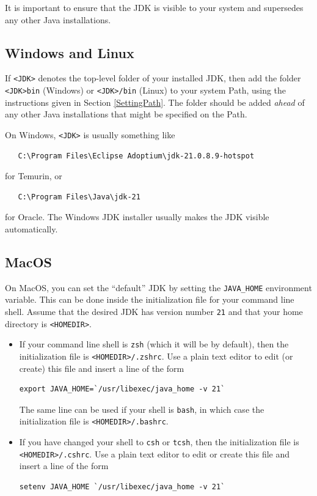 \documentclass{article}
\begin{document}
It is important to ensure that the JDK is visible to your system and
supersedes any other Java installations.

\subsection{Windows and Linux}

If {\tt <JDK>} denotes the top-level folder of your installed JDK,
then add the folder {\tt <JDK>\BKS bin} (Windows) or {\tt <JDK>/bin}
(Linux) to your system Path, using the instructions given in Section
\ref{SettingPath}. The folder should be added {\it ahead} of any other
Java installations that might be specified on the Path.

On Windows, {\tt <JDK>} is usually something like
\begin{verbatim}
   C:\Program Files\Eclipse Adoptium\jdk-21.0.8.9-hotspot
\end{verbatim}
for Temurin, or 
\begin{verbatim}
   C:\Program Files\Java\jdk-21
\end{verbatim}
for Oracle. The Windows JDK installer usually makes the JDK visible
automatically.

\subsection{MacOS}

On MacOS, you can set the ``default'' JDK by setting the {\tt JAVA\_HOME}
environment variable.  This can be done inside the initialization file for your
command line shell.  Assume that the desired JDK has version number {\tt 21}
and that your home directory is {\tt <HOMEDIR>}.

\begin{itemize}

\item If your command line shell is {\tt zsh} (which it will be by
default), then the initialization file is {\tt <HOMEDIR>/.zshrc}. Use a
plain text editor to edit (or create) this file and insert a line of
the form
%
\begin{lstlisting}[]
  export JAVA_HOME=`/usr/libexec/java_home -v 21`
\end{lstlisting}
%
The same line can be used if your shell is {\tt bash}, in which case
the initialization file is {\tt <HOMEDIR>/.bashrc}.

\item If you have changed your shell to {\tt csh} or {\tt tcsh},
then the initialization file is {\tt <HOMEDIR>/.cshrc}. Use a plain text editor
to edit or create this file and insert a line of the form
%
\begin{lstlisting}[]
  setenv JAVA_HOME `/usr/libexec/java_home -v 21`
\end{lstlisting}
%

\end{itemize}
\end{document}
